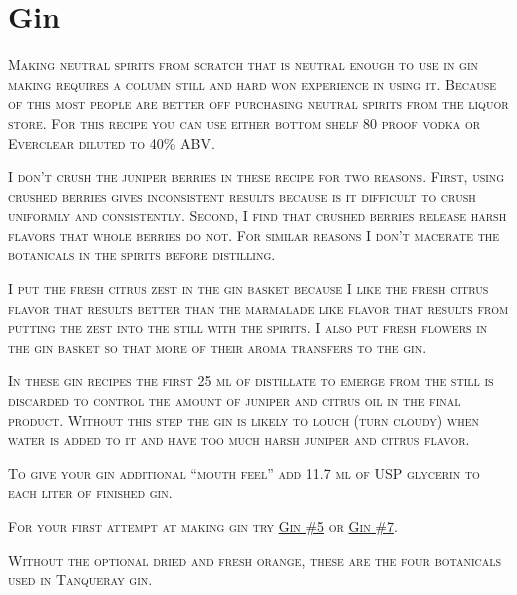 \documentclass[letterpaper]{recipePMG}
\begin{document}
\chapter{Gin}


\textsc{Making neutral spirits from scratch that is neutral enough to use in gin making requires a column still and hard won experience in using it. Because of this most people are better off purchasing neutral spirits from the liquor store. For this recipe you can use either bottom shelf 80 proof vodka or Everclear diluted to 40\% ABV.}

\textsc{I don't crush the juniper berries in these recipe for two reasons. First, using crushed berries gives inconsistent results because is it difficult to crush uniformly and consistently. Second, I find that crushed berries release harsh flavors that whole berries do not. For similar reasons I don't macerate the botanicals in the spirits before distilling.}

\textsc{I put the fresh citrus zest in the gin basket because I like the fresh citrus flavor that results better than the marmalade like flavor that results from putting the zest into the still with the spirits. I also put fresh flowers in the gin basket so that more of their aroma transfers to the gin.}

\textsc{In these gin recipes the first 25 ml of distillate to emerge from the still is discarded to control the amount of juniper and citrus oil in the final product.  Without this step the gin is likely to louch (turn cloudy) when water is added to it and have too much harsh juniper and citrus flavor. }

\textsc{To give your gin additional ``mouth feel'' add 11.7 ml of USP glycerin to each liter of finished gin.}

\textsc{For your first attempt at making gin try \hyperref[GinNumber5]{Gin \#5} or \hyperref[GinNumber7]{Gin \#7}}.

\newpage

\label{GinNumber1}


\textsc{Without the optional dried and fresh orange, these are the four botanicals used in Tanqueray gin.}
\end{document}
